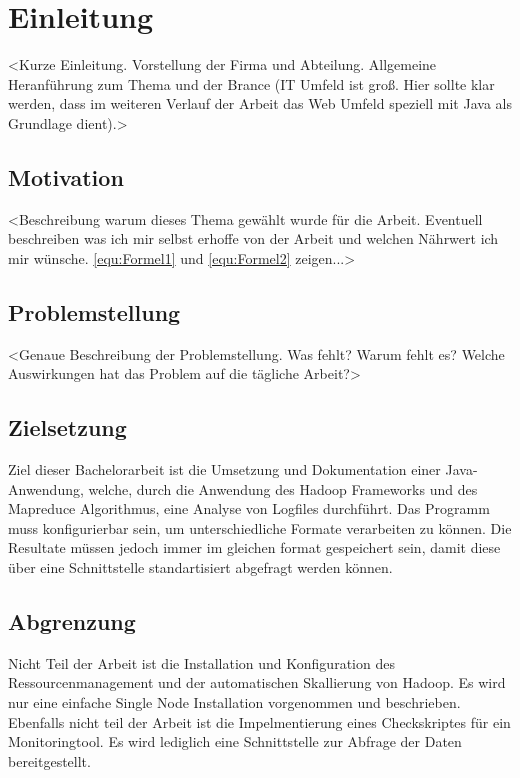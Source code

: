 
\chapter{Einleitung}\label{cha:Einleitung}
<Kurze Einleitung. Vorstellung der Firma und Abteilung. Allgemeine Heranführung zum Thema und der Brance (IT Umfeld ist groß. Hier sollte klar werden, dass im weiteren Verlauf der Arbeit das Web Umfeld speziell mit Java als Grundlage dient).>

\section{Motivation}\label{sec:Motivation}
<Beschreibung warum dieses Thema gewählt wurde für die Arbeit. Eventuell beschreiben was ich mir selbst erhoffe von der Arbeit und welchen Nährwert ich mir wünsche. \autoref{equ:Formel1} und \ref{equ:Formel2} zeigen...>

\section{Problemstellung}\label{sec:Problemstellung}
<Genaue Beschreibung der Problemstellung. Was fehlt? Warum fehlt es? Welche Auswirkungen hat das Problem auf die tägliche Arbeit?>

\section{Zielsetzung}\label{sec:Zielsetzung}
Ziel dieser Bachelorarbeit ist die Umsetzung und Dokumentation einer Java-Anwendung, welche, durch die Anwendung des Hadoop Frameworks und des Mapreduce Algorithmus, eine Analyse von Logfiles durchführt. Das Programm muss konfigurierbar sein, um unterschiedliche Formate verarbeiten zu können. Die  Resultate müssen jedoch immer im gleichen format gespeichert sein, damit diese über eine Schnittstelle standartisiert abgefragt werden können.



\section{Abgrenzung}\label{sec:Abgrenzung}
Nicht Teil der Arbeit ist die Installation und Konfiguration des Ressourcenmanagement und der automatischen Skallierung von Hadoop. Es wird nur eine einfache Single Node Installation vorgenommen und beschrieben. Ebenfalls nicht teil der Arbeit ist die Impelmentierung eines Checkskriptes für ein Monitoringtool. Es wird lediglich eine Schnittstelle zur Abfrage der Daten bereitgestellt.

